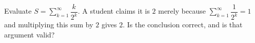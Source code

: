 Evaluate $S=\sum_{k=1}^{\infty}\dfrac{k}{2^k}$. A student claims it is $2$ merely because $\sum_{k=1}^{\infty}\dfrac{1}{2^k}=1$ and multiplying this sum by $2$ gives $2$. Is the conclusion correct, and is that argument valid?
